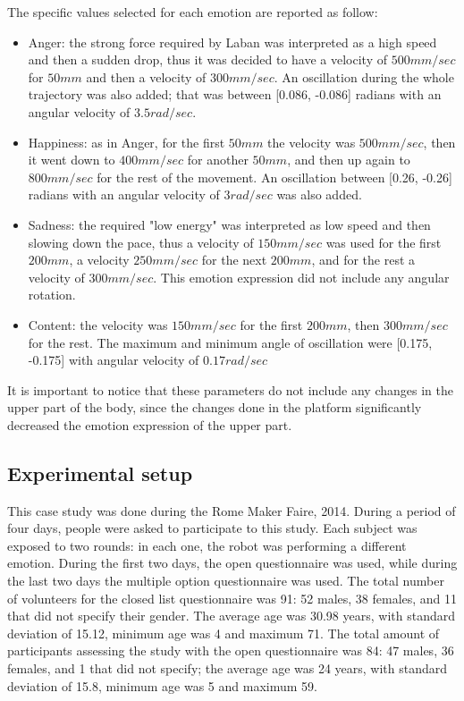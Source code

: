 The specific values selected for each emotion are reported as follow:

\begin{itemize}
	
	\item Anger: the strong force required by Laban was interpreted as a high speed and then a sudden drop, thus it was decided to have a velocity of $500mm/sec$ for $50mm$ and then a velocity of $300mm/sec$. An oscillation during the whole trajectory was also added; that was between [0.086, -0.086] radians with an angular velocity of $3.5 rad/sec$.
	
	\item Happiness: as in Anger, for the first $50mm$ the velocity was $500mm/sec$, then it went down to $400mm/sec$ for another $50mm$, and then up again to $800mm/sec$ for the rest of the movement. 
	An oscillation between [0.26, -0.26] radians with an angular velocity of $3rad/sec$ was also added.
	
	\item Sadness: the required "low energy" was interpreted as low speed and then slowing down the pace, thus a velocity of $150mm/sec$ was used for the first $200mm$, a velocity $250mm/sec$ for the next $200mm$, and for the rest a velocity of $300mm/sec$. This emotion expression did not include any angular rotation.
	
	\item Content: the velocity was $150mm/sec$ for the first $200mm$, then $300mm/sec$ for the rest. The maximum and minimum angle of oscillation were [0.175, -0.175] with angular velocity of $0.17rad/sec$
\end{itemize}

It is important to notice that these parameters do not include any changes in the upper part of the body, since the changes done in the platform significantly decreased the emotion expression of the upper part.

\subsection{Experimental setup}

This case study was done during the Rome Maker Faire, 2014. During a period of four days, people were asked to participate to this study. Each subject was exposed to two rounds: in each one, the robot was performing a different emotion. During the first two days, the open questionnaire was used, while during the last two days the multiple option questionnaire was used. The total number of volunteers for the closed list questionnaire was 91: 52 males, 38 females, and 11 that did not specify their gender. The average age was 30.98 years, with standard deviation of 15.12, minimum age was 4 and maximum 71. The total amount of participants assessing the study with the open questionnaire was 84: 47 males, 36 females, and 1 that did not specify; the average age was 24 years, with standard deviation of 15.8, minimum age was 5 and maximum 59. 

